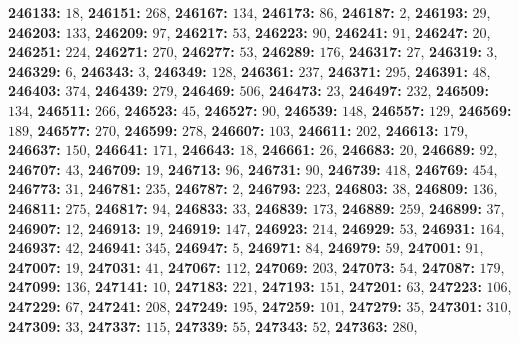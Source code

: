 \textsf{\bfseries 246133:} $18$, \textsf{\bfseries 246151:} $268$, \textsf{\bfseries 246167:} $134$, \textsf{\bfseries 246173:} $86$, \textsf{\bfseries 246187:} $2$, \textsf{\bfseries 246193:} $29$, \textsf{\bfseries 246203:} $133$, \textsf{\bfseries 246209:} $97$, \textsf{\bfseries 246217:} $53$, \textsf{\bfseries 246223:} $90$, \textsf{\bfseries 246241:} $91$, \textsf{\bfseries 246247:} $20$, \textsf{\bfseries 246251:} $224$, \textsf{\bfseries 246271:} $270$, \textsf{\bfseries 246277:} $53$, \textsf{\bfseries 246289:} $176$, \textsf{\bfseries 246317:} $27$, \textsf{\bfseries 246319:} $3$, \textsf{\bfseries 246329:} $6$, \textsf{\bfseries 246343:} $3$, \textsf{\bfseries 246349:} $128$, \textsf{\bfseries 246361:} $237$, \textsf{\bfseries 246371:} $295$, \textsf{\bfseries 246391:} $48$, \textsf{\bfseries 246403:} $374$, \textsf{\bfseries 246439:} $279$, \textsf{\bfseries 246469:} $506$, \textsf{\bfseries 246473:} $23$, \textsf{\bfseries 246497:} $232$, \textsf{\bfseries 246509:} $134$, \textsf{\bfseries 246511:} $266$, \textsf{\bfseries 246523:} $45$, \textsf{\bfseries 246527:} $90$, \textsf{\bfseries 246539:} $148$, \textsf{\bfseries 246557:} $129$, \textsf{\bfseries 246569:} $189$, \textsf{\bfseries 246577:} $270$, \textsf{\bfseries 246599:} $278$, \textsf{\bfseries 246607:} $103$, \textsf{\bfseries 246611:} $202$, \textsf{\bfseries 246613:} $179$, \textsf{\bfseries 246637:} $150$, \textsf{\bfseries 246641:} $171$, \textsf{\bfseries 246643:} $18$, \textsf{\bfseries 246661:} $26$, \textsf{\bfseries 246683:} $20$, \textsf{\bfseries 246689:} $92$, \textsf{\bfseries 246707:} $43$, \textsf{\bfseries 246709:} $19$, \textsf{\bfseries 246713:} $96$, \textsf{\bfseries 246731:} $90$, \textsf{\bfseries 246739:} $418$, \textsf{\bfseries 246769:} $454$, \textsf{\bfseries 246773:} $31$, \textsf{\bfseries 246781:} $235$, \textsf{\bfseries 246787:} $2$, \textsf{\bfseries 246793:} $223$, \textsf{\bfseries 246803:} $38$, \textsf{\bfseries 246809:} $136$, \textsf{\bfseries 246811:} $275$, \textsf{\bfseries 246817:} $94$, \textsf{\bfseries 246833:} $33$, \textsf{\bfseries 246839:} $173$, \textsf{\bfseries 246889:} $259$, \textsf{\bfseries 246899:} $37$, \textsf{\bfseries 246907:} $12$, \textsf{\bfseries 246913:} $19$, \textsf{\bfseries 246919:} $147$, \textsf{\bfseries 246923:} $214$, \textsf{\bfseries 246929:} $53$, \textsf{\bfseries 246931:} $164$, \textsf{\bfseries 246937:} $42$, \textsf{\bfseries 246941:} $345$, \textsf{\bfseries 246947:} $5$, \textsf{\bfseries 246971:} $84$, \textsf{\bfseries 246979:} $59$, \textsf{\bfseries 247001:} $91$, \textsf{\bfseries 247007:} $19$, \textsf{\bfseries 247031:} $41$, \textsf{\bfseries 247067:} $112$, \textsf{\bfseries 247069:} $203$, \textsf{\bfseries 247073:} $54$, \textsf{\bfseries 247087:} $179$, \textsf{\bfseries 247099:} $136$, \textsf{\bfseries 247141:} $10$, \textsf{\bfseries 247183:} $221$, \textsf{\bfseries 247193:} $151$, \textsf{\bfseries 247201:} $63$, \textsf{\bfseries 247223:} $106$, \textsf{\bfseries 247229:} $67$, \textsf{\bfseries 247241:} $208$, \textsf{\bfseries 247249:} $195$, \textsf{\bfseries 247259:} $101$, \textsf{\bfseries 247279:} $35$, \textsf{\bfseries 247301:} $310$, \textsf{\bfseries 247309:} $33$, \textsf{\bfseries 247337:} $115$, \textsf{\bfseries 247339:} $55$, \textsf{\bfseries 247343:} $52$, \textsf{\bfseries 247363:} $280$, 
